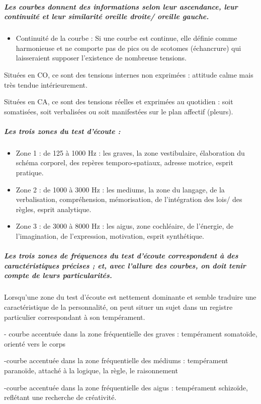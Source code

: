 {\subparagraph{Les courbes donnent des informations selon leur ascendance, leur
continuité et leur similarité oreille droite/ oreille gauche.}
\begin{itemize}
\item Continuité de la courbe : Si une courbe est continue, elle définie
comme harmonieuse et ne comporte pas de pics ou de scotomes (échancrure)  qui laisseraient
supposer l'existence de nombreuse tensions.
\end{itemize}
Situées en CO, ce sont des tensions internes non exprimées : attitude
calme mais très tendue intérieurement.

Situées en CA, ce sont des tensions réelles et exprimées au quotidien
: soit somatisées, soit verbalisées ou soit manifestées sur le plan
affectif (pleurs).

\subparagraph{Les trois zones du test d'écoute : }
\begin{itemize}
\item Zone 1 : de 125 à 1000 Hz : les graves, la zone vestibulaire, élaboration
du schéma corporel, des repères temporo-spatiaux, adresse motrice,
esprit pratique.
\item Zone 2 : de 1000 à 3000 Hz : les mediums, la zone du langage, de la
verbalisation, compréhension, mémorisation, de l'intégration des lois/
des règles, esprit analytique.
\item Zone 3 : de 3000 à 8000 Hz : les aigus, zone cochléaire, de l'énergie,
de l'imagination, de l'expression, motivation, esprit synthétique.
\end{itemize}

\subparagraph{Les trois zones de fréquences du test d'écoute correspondent à des
caractéristiques précises ; et, avec l'allure des courbes, on doit
tenir compte de leurs particularités.}

Lorsqu'une zone du test d'écoute est nettement dominante et semble
traduire une caractéristique de la personnalité, on peut situer un
sujet dans un registre particulier correspondant à son tempérament.

- courbe accentuée dans la zone fréquentielle des graves : tempérament
somatoïde, orienté vers le corps

-courbe accentuée dans la zone fréquentielle des médiums : tempérament
paranoïde, attaché à la logique, la règle, le raisonnement 

-courbe accentuée dans la zone fréquentielle des aigus : tempérament
schizoïde, reflétant une recherche de créativité. 

}

